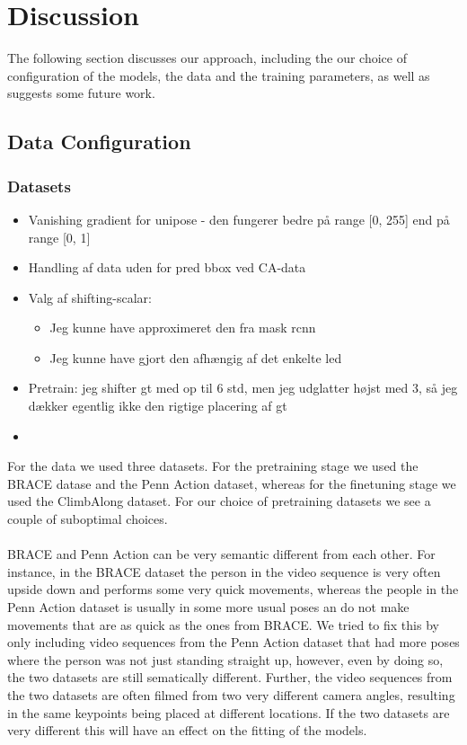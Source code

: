 \documentclass[./main.tex]{subfiles}
\begin{document}
\section{Discussion}
The following section discusses our approach, including the our choice of configuration of the models, the data and the training parameters, as well as suggests some future work.


\subsection{Data Configuration}
\subsubsection{Datasets}
\begin{itemize}
    \item Vanishing gradient for unipose - den fungerer bedre på range [0, 255] end på range [0, 1]
    \item Handling af data uden for pred bbox ved CA-data
    \item Valg af shifting-scalar:
    \begin{itemize}
        \item Jeg kunne have approximeret den fra mask rcnn
        \item Jeg kunne have gjort den afhængig af det enkelte led
    \end{itemize}
    \item Pretrain: jeg shifter gt med op til 6 std, men jeg udglatter højst med 3, så jeg dækker egentlig ikke den rigtige placering af gt
    \item 
\end{itemize}
For the data we used three datasets. For the pretraining stage we used the BRACE datase and the Penn Action dataset, whereas for the finetuning stage we used the ClimbAlong dataset. For our choice of pretraining datasets we see a couple of suboptimal choices. 
\\
\\
BRACE and Penn Action can be very semantic different from each other. For instance, in the BRACE dataset the person in the video sequence is very often upside down and performs some very quick movements, whereas the people in the Penn Action dataset is usually in some more usual poses an do not make movements that are as quick as the ones from BRACE. We tried to fix this by only including video sequences from the Penn Action dataset that had more poses where the person was not just standing straight up, however, even by doing so, the two datasets are still sematically different. Further, the video sequences from the two datasets are often filmed from two very different camera angles, resulting in the same keypoints being placed at different locations. If the two datasets are very different this will have an effect on the fitting of the models.
\end{document}
